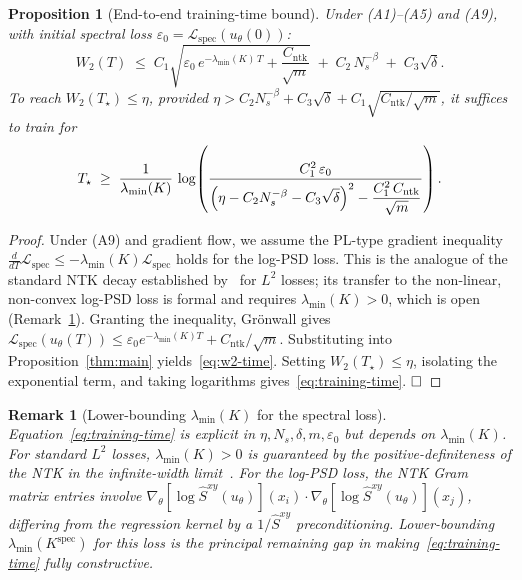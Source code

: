 \documentclass[review,12pt]{elsarticle}
\newtheorem{remark}{Remark}
\newtheorem{proposition}{Proposition}
\begin{document}
\begin{proposition}[End-to-end training-time bound]
\label{prop:ntk}
Under (A1)--(A5) and (A9), with initial spectral loss
$\varepsilon_0=\mathcal{L}_{\mathrm{spec}}(u_\theta(0))$:
\begin{equation}
\label{eq:w2-time}
W_2(T)\;\le\;
C_1\!\sqrt{\varepsilon_0\,e^{-\lambda_{\min}(K)\,T}
+\frac{C_{\mathrm{ntk}}}{\sqrt{m}}}
\;+\;C_2\,N_s^{-\beta}\;+\;C_3\sqrt\delta.
\end{equation}
To reach $W_2(T_\star)\le\eta$, provided
$\eta>C_2 N_s^{-\beta}+C_3\sqrt\delta
+C_1\sqrt{C_{\mathrm{ntk}}/\sqrt{m}}$,
it suffices to train for
\begin{equation}
\label{eq:training-time}
T_\star\;\ge\;
\frac{1}{\lambda_{\min}(K)}\,
\log\!\left(
\frac{C_1^2\,\varepsilon_0}
{\displaystyle\Bigl(\eta-C_2 N_s^{-\beta}-C_3\sqrt\delta\Bigr)^2
-\dfrac{C_1^2\,C_{\mathrm{ntk}}}{\sqrt{m}}}
\right).
\end{equation}
\end{proposition}

\begin{proof}
Under (A9) and gradient flow, we assume the PL-type gradient
inequality
$\tfrac{d}{dT}\mathcal{L}_{\mathrm{spec}}
\le -\lambda_{\min}(K)\mathcal{L}_{\mathrm{spec}}$
holds for the log-PSD loss. This is the analogue of the standard
NTK decay established by~\cite{Wang2022} for $L^2$ losses; its
transfer to the non-linear, non-convex log-PSD loss is formal and
requires $\lambda_{\min}(K)>0$, which is open (Remark~\ref{rem:lambda-min}).
Granting the inequality, Gr\"onwall gives
$\mathcal{L}_{\mathrm{spec}}(u_\theta(T))
\le\varepsilon_0 e^{-\lambda_{\min}(K)T}+C_{\mathrm{ntk}}/\sqrt{m}$.
Substituting into Proposition~\ref{thm:main} yields~\eqref{eq:w2-time}.
Setting $W_2(T_\star)\le\eta$, isolating the exponential term, and
taking logarithms gives~\eqref{eq:training-time}.
$\hfill\square$
\end{proof}

\begin{remark}[Lower-bounding $\lambda_{\min}(K)$ for the spectral loss]
\label{rem:lambda-min}
Equation~\eqref{eq:training-time} is explicit in $\eta,N_s,\delta,m,\varepsilon_0$
but depends on $\lambda_{\min}(K)$.
For standard $L^2$ losses, $\lambda_{\min}(K)>0$ is guaranteed by the
positive-definiteness of the NTK in the infinite-width
limit~\cite{Wang2022}. For the log-PSD loss, the NTK Gram matrix
entries involve $\nabla_\theta[\log\widehat{S}^{xy}(u_\theta)](x_i)
\cdot\nabla_\theta[\log\widehat{S}^{xy}(u_\theta)](x_j)$,
differing from the regression kernel by a $1/\widehat{S}^{xy}$
preconditioning. Lower-bounding $\lambda_{\min}(K^{\mathrm{spec}})$
for this loss is the principal remaining gap in
making~\eqref{eq:training-time} fully constructive.
\end{remark}
\end{document}
